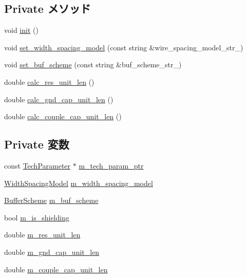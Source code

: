 \subsection*{Private メソッド}
\begin{DoxyCompactItemize}
\item 
void \hyperlink{classWire_a02fd73d861ef2e4aabb38c0c9ff82947}{init} ()
\item 
void \hyperlink{classWire_a0355236c41e8ee47a25e1d9b472efd6f}{set\_\-width\_\-spacing\_\-model} (const string \&wire\_\-spacing\_\-model\_\-str\_\-)
\item 
void \hyperlink{classWire_a325bc6dca0ef49f0a342ab21009c093f}{set\_\-buf\_\-scheme} (const string \&buf\_\-scheme\_\-str\_\-)
\item 
double \hyperlink{classWire_a564f10276cadbde4eeab5ed642ccfea5}{calc\_\-res\_\-unit\_\-len} ()
\item 
double \hyperlink{classWire_a9ef7d27c0caf3ac0b3d349ee0cd9440f}{calc\_\-gnd\_\-cap\_\-unit\_\-len} ()
\item 
double \hyperlink{classWire_ac69573908f0ce2eba5323ef8b8f72257}{calc\_\-couple\_\-cap\_\-unit\_\-len} ()
\end{DoxyCompactItemize}
\subsection*{Private 変数}
\begin{DoxyCompactItemize}
\item 
const \hyperlink{classTechParameter}{TechParameter} $\ast$ \hyperlink{classWire_a11d1644aa2bfe0e16783dface6fadf13}{m\_\-tech\_\-param\_\-ptr}
\item 
\hyperlink{classWire_afda9b782c9bf7887962c0498409f7a72}{WidthSpacingModel} \hyperlink{classWire_a337b5fb47933bd32d61be3f7687bee78}{m\_\-width\_\-spacing\_\-model}
\item 
\hyperlink{classWire_ac0e7fde4e26e813ba7a23f9b187087df}{BufferScheme} \hyperlink{classWire_ab269e7d52086534da59ac80c05d61ddf}{m\_\-buf\_\-scheme}
\item 
bool \hyperlink{classWire_a30a69ab7be11cb270516c7513c71a082}{m\_\-is\_\-shielding}
\item 
double \hyperlink{classWire_aaafce977b96802f23fd6822c743fe6a9}{m\_\-res\_\-unit\_\-len}
\item 
double \hyperlink{classWire_a32158d7eb1d908434b68e4fd021804e9}{m\_\-gnd\_\-cap\_\-unit\_\-len}
\item 
double \hyperlink{classWire_a86d2fcfb3f197c23780be7f3d8a7e09f}{m\_\-couple\_\-cap\_\-unit\_\-len}
\end{DoxyCompactItemize}


